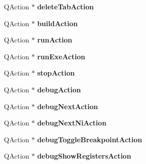 \begin{DoxyCompactItemize}
\item 
\hypertarget{class_main_window_a8f5db4cdc4dc7f610ace1b97f64f42fb}{}Q\+Action $\ast$ {\bfseries delete\+Tab\+Action}\label{class_main_window_a8f5db4cdc4dc7f610ace1b97f64f42fb}

\item 
\hypertarget{class_main_window_a29f530ec086e65c4a35eb28e68fd2236}{}Q\+Action $\ast$ {\bfseries build\+Action}\label{class_main_window_a29f530ec086e65c4a35eb28e68fd2236}

\item 
\hypertarget{class_main_window_a84ae1463c68554b9d2e3ff3fa2c30c25}{}Q\+Action $\ast$ {\bfseries run\+Action}\label{class_main_window_a84ae1463c68554b9d2e3ff3fa2c30c25}

\item 
\hypertarget{class_main_window_a9b4544dc6986833c366d47c5b83632bf}{}Q\+Action $\ast$ {\bfseries run\+Exe\+Action}\label{class_main_window_a9b4544dc6986833c366d47c5b83632bf}

\item 
\hypertarget{class_main_window_a9b1cc672dc054704f2dfbe47386793b5}{}Q\+Action $\ast$ {\bfseries stop\+Action}\label{class_main_window_a9b1cc672dc054704f2dfbe47386793b5}

\item 
\hypertarget{class_main_window_a4a8e530692fbabf29c34083616628bf9}{}Q\+Action $\ast$ {\bfseries debug\+Action}\label{class_main_window_a4a8e530692fbabf29c34083616628bf9}

\item 
\hypertarget{class_main_window_af618c0de06267e6b249bf5681dde4d45}{}Q\+Action $\ast$ {\bfseries debug\+Next\+Action}\label{class_main_window_af618c0de06267e6b249bf5681dde4d45}

\item 
\hypertarget{class_main_window_af10d588a7952b147e345945ef345cd1c}{}Q\+Action $\ast$ {\bfseries debug\+Next\+Ni\+Action}\label{class_main_window_af10d588a7952b147e345945ef345cd1c}

\item 
\hypertarget{class_main_window_a1526ae1c06e5cdace7bba5e3d17a0780}{}Q\+Action $\ast$ {\bfseries debug\+Toggle\+Breakpoint\+Action}\label{class_main_window_a1526ae1c06e5cdace7bba5e3d17a0780}

\item 
\hypertarget{class_main_window_abdf5fb2ab70cac959f1252548bb5df01}{}Q\+Action $\ast$ {\bfseries debug\+Show\+Registers\+Action}\label{class_main_window_abdf5fb2ab70cac959f1252548bb5df01}


\end{DoxyCompactItemize}
